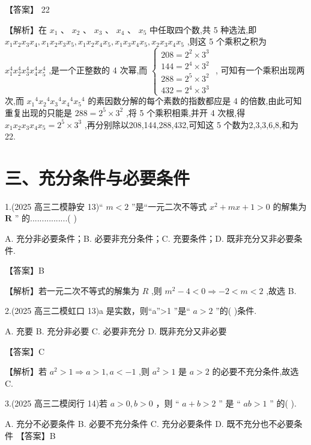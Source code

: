 \documentclass[10pt]{article}
\begin{document}
【答案】 22

【解析】在 \({x}_{1}\text{ 、 }{x}_{2}\text{ 、 }{x}_{3}\text{ 、 }{x}_{4}\text{ 、 }{x}_{5}\) 中任取四个数,共 5 种选法,即 \({x}_{1}{x}_{2}{x}_{3}{x}_{4},{x}_{1}{x}_{2}{x}_{3}{x}_{5},{x}_{1}{x}_{2}{x}_{4}{x}_{5},{x}_{1}{x}_{3}{x}_{4}{x}_{5},{x}_{2}{x}_{3}{x}_{4}{x}_{5}\) ,则这 5 个乘积之积为 \({x}_{1}^{4}{x}_{2}^{4}{x}_{3}^{4}{x}_{4}^{4}{x}_{5}^{4}\) ,是一个正整数的 4 次幂,而 \(\left\{  \begin{array}{l} {208} = {2}^{2} \times  {3}^{3} \\  {144} = {2}^{4} \times  {3}^{2} \\  {288} = {2}^{5} \times  {3}^{2} \\  {432} = {2}^{4} \times  {3}^{3} \end{array}\right.\) , 可知有一个乘积出现两次,而 \({x}_{1}{}^{4}{x}_{2}{}^{4}{x}_{3}{}^{4}{x}_{4}{}^{4}{x}_{5}{}^{4}\) 的素因数分解的每个素数的指数都应是 4 的倍数,由此可知重复出现的只能是 \({288} = {2}^{5} \times  {3}^{2}\) ,将 5 个乘积相乘,并开 4 次根,得 \({x}_{1}{x}_{2}{x}_{3}{x}_{4}{x}_{5} = {2}^{5} \times  {3}^{3}\) ,再分别除以208,144,288,432,可知这 5 个数为2,3,3,6,8,和为 22.

\section*{三、充分条件与必要条件}

1.(2025 高三二模静安 13)“ \(m < 2\) ”是“一元二次不等式 \({x}^{2} + {mx} + 1 > 0\) 的解集为 \(\mathbf{R}\) ” 的................( )

A. 充分非必要条件；B. 必要非充分条件；C. 充要条件；D. 既非充分又非必要条件.

【答案】B

【解析】若一元二次不等式的解集为 \(R\) ,则 \({m}^{2} - 4 < 0 \Rightarrow   - 2 < m < 2\) ,故选 B.

2.(2025 高三二模虹口 13)a 是实数，则“a”>1 ”是“ \(a > 2\) ”的( )条件.

A. 充要 B. 充分非必要 C. 必要非充分 D. 既非充分又非必要

【答案】C

【解析】若 \({a}^{2} > 1 \Rightarrow  a > 1,a <  - 1\) ,则 \({a}^{2} > 1\) 是 \(a > 2\) 的必要不充分条件,故选 C.

3.(2025 高三二模闵行 14)若 \(a > 0,b > 0\) ，则 “ \(a + b > 2\) ” 是 “ \({ab} > 1\) ” 的( ).

A. 充分不必要条件 B. 必要不充分条件 C. 充分必要条件 D. 既不充分也不必要条件 【答案】B
\end{document}
